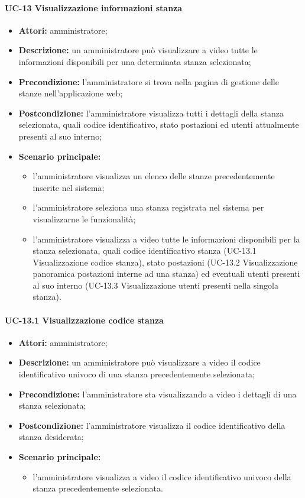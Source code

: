 \paragraph{UC-13 Visualizzazione informazioni stanza}
\begin{itemize}
    \item \textbf{Attori:} amministratore;
    \item \textbf{Descrizione:} un amministratore pu\`{o} visualizzare a video tutte le informazioni disponibili per una determinata stanza selezionata;
    \item \textbf{Precondizione:} l'amministratore si trova nella pagina di gestione delle stanze nell'applicazione web;
    \item \textbf{Postcondizione:} l'amministratore visualizza tutti i dettagli della stanza selezionata, quali codice identificativo, stato postazioni ed utenti attualmente presenti al suo interno;
    \item \textbf{Scenario principale:}
    \begin{itemize}
        \item l'amministratore visualizza un elenco delle stanze precedentemente inserite nel sistema;
        \item l'amministratore seleziona una stanza registrata nel sistema per visualizzarne le funzionalità;
        \item l'amministratore visualizza a video tutte le informazioni disponibili per la stanza selezionata, quali codice identificativo stanza (UC-13.1 Visualizzazione codice stanza), stato postazioni (UC-13.2 Visualizzazione panoramica postazioni interne ad una stanza) ed eventuali utenti presenti al suo interno (UC-13.3 Visualizzazione utenti presenti nella singola stanza).
    \end{itemize}
\end{itemize}

\paragraph{UC-13.1 Visualizzazione codice stanza}
\begin{itemize}
    \item \textbf{Attori:} amministratore;
    \item \textbf{Descrizione:} un amministratore pu\`{o} visualizzare a video il codice identificativo univoco di una stanza precedentemente selezionata;
    \item \textbf{Precondizione:} l'amministratore sta visualizzando a video i dettagli di una stanza selezionata;
    \item \textbf{Postcondizione:} l'amministratore visualizza il codice identificativo della stanza desiderata;
    \item \textbf{Scenario principale:}
    \begin{itemize}
        \item l'amministratore visualizza a video il codice identificativo univoco della stanza precedentemente selezionata.
    \end{itemize}
\end{itemize}

